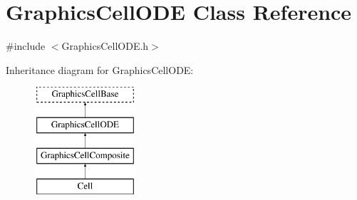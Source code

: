 \hypertarget{class_graphics_cell_o_d_e}{\section{\-Graphics\-Cell\-O\-D\-E \-Class \-Reference}
\label{class_graphics_cell_o_d_e}
}


{\ttfamily \#include $<$\-Graphics\-Cell\-O\-D\-E.\-h$>$}

\-Inheritance diagram for \-Graphics\-Cell\-O\-D\-E\-:\begin{figure}[H]
\begin{center}
\leavevmode
\includegraphics[height=4.000000cm]{class_graphics_cell_o_d_e}
\end{center}
\end{figure}
